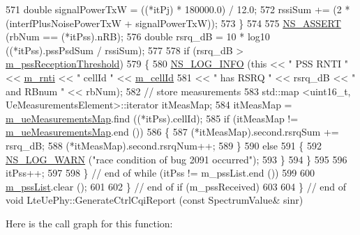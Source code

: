 \begin{DoxyCode}
571               \textcolor{keywordtype}{double} signalPowerTxW = ((*itPj) * 180000.0) / 12.0;
572               rssiSum += (2 * (interfPlusNoisePowerTxW + signalPowerTxW));
573             \}
574 
575           \hyperlink{assert_8h_a6dccdb0de9b252f60088ce281c49d052}{NS\_ASSERT} (rbNum == (*itPss).nRB);
576           \textcolor{keywordtype}{double} rsrq\_dB = 10 * log10 ((*itPss).pssPsdSum / rssiSum);
577 
578           \textcolor{keywordflow}{if} (rsrq\_dB > \hyperlink{classns3_1_1LteUePhy_af32a732f17a4d74ccd03b03471b5e1d3}{m\_pssReceptionThreshold})
579             \{
580               \hyperlink{group__logging_gafbd73ee2cf9f26b319f49086d8e860fb}{NS\_LOG\_INFO} (\textcolor{keyword}{this} << \textcolor{stringliteral}{" PSS RNTI "} << \hyperlink{classns3_1_1LteUePhy_a887b5dc4e246a308cd09127b64ed8fac}{m\_rnti} << \textcolor{stringliteral}{" cellId "} << 
      \hyperlink{classns3_1_1LtePhy_ac53d10d27f1bde64807a3ff366662787}{m\_cellId}
581                                 << \textcolor{stringliteral}{" has RSRQ "} << rsrq\_dB << \textcolor{stringliteral}{" and RBnum "} << rbNum);
582               \textcolor{comment}{// store measurements}
583               std::map <uint16\_t, UeMeasurementsElement>::iterator itMeasMap;
584               itMeasMap = \hyperlink{classns3_1_1LteUePhy_a3d064f4bdc58614aa1e12c44a8ec111b}{m\_ueMeasurementsMap}.find ((*itPss).cellId);
585               \textcolor{keywordflow}{if} (itMeasMap != \hyperlink{classns3_1_1LteUePhy_a3d064f4bdc58614aa1e12c44a8ec111b}{m\_ueMeasurementsMap}.end ())
586                 \{
587                   (*itMeasMap).second.rsrqSum += rsrq\_dB;
588                   (*itMeasMap).second.rsrqNum++;
589                 \}
590               \textcolor{keywordflow}{else}
591                 \{
592                   \hyperlink{group__logging_gade7208b4009cdf0e25783cd26766f559}{NS\_LOG\_WARN} (\textcolor{stringliteral}{"race condition of bug 2091 occurred"});
593                 \}
594             \}
595 
596           itPss++;
597 
598         \} \textcolor{comment}{// end of while (itPss != m\_pssList.end ())}
599 
600       \hyperlink{classns3_1_1LteUePhy_a65bf8a30d9bdcfbe5f8e2faac4007406}{m\_pssList}.clear ();
601 
602     \} \textcolor{comment}{// end of if (m\_pssReceived)}
603 
604 \} \textcolor{comment}{// end of void LteUePhy::GenerateCtrlCqiReport (const SpectrumValue& sinr)}
\end{DoxyCode}


Here is the call graph for this function\+:




